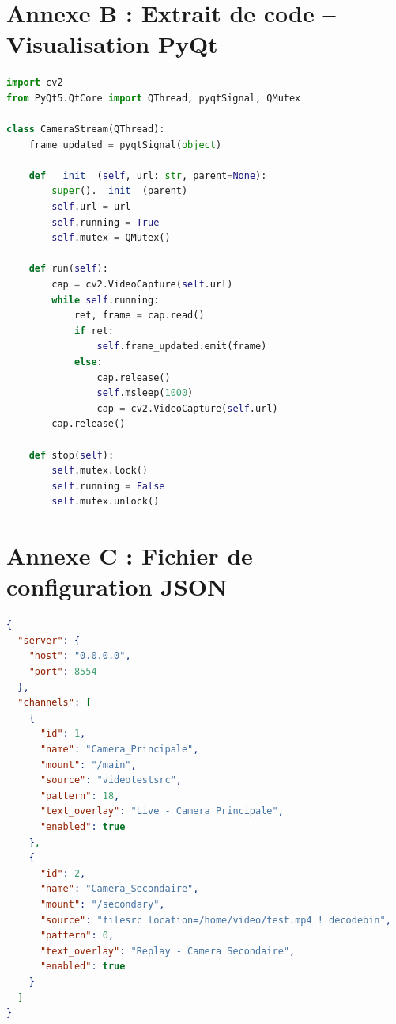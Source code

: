 \documentclass[12pt,a4paper]{report}
\begin{document}
\section*{Annexe B : Extrait de code – Visualisation PyQt}

\begin{lstlisting}[language=python, caption=camera_stream.py]
import cv2
from PyQt5.QtCore import QThread, pyqtSignal, QMutex

class CameraStream(QThread):
    frame_updated = pyqtSignal(object)
    
    def __init__(self, url: str, parent=None):
        super().__init__(parent)
        self.url = url
        self.running = True
        self.mutex = QMutex()
        
    def run(self):
        cap = cv2.VideoCapture(self.url)
        while self.running:
            ret, frame = cap.read()
            if ret:
                self.frame_updated.emit(frame)
            else:
                cap.release()
                self.msleep(1000)
                cap = cv2.VideoCapture(self.url)
        cap.release()
    
    def stop(self):
        self.mutex.lock()
        self.running = False
        self.mutex.unlock()
\end{lstlisting}

\section*{Annexe C : Fichier de configuration JSON}

\begin{lstlisting}[language=json, caption=rtsp_config.json]
{
  "server": {
    "host": "0.0.0.0",
    "port": 8554
  },
  "channels": [
    {
      "id": 1,
      "name": "Camera_Principale",
      "mount": "/main",
      "source": "videotestsrc",
      "pattern": 18,
      "text_overlay": "Live - Camera Principale",
      "enabled": true
    },
    {
      "id": 2,
      "name": "Camera_Secondaire",
      "mount": "/secondary",
      "source": "filesrc location=/home/video/test.mp4 ! decodebin",
      "pattern": 0,
      "text_overlay": "Replay - Camera Secondaire",
      "enabled": true
    }
  ]
}
\end{lstlisting}

\end{document}
